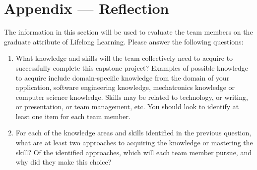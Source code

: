 \documentclass[12pt]{article}
\begin{document}
\newpage{}
\section*{Appendix --- Reflection}

The information in this section will be used to evaluate the team members on the
graduate attribute of Lifelong Learning.  Please answer the following questions:

\begin{enumerate}
  \item What knowledge and skills will the team collectively need to acquire to
  successfully complete this capstone project?  Examples of possible knowledge
  to acquire include domain-specific knowledge from the domain of your
  application, software engineering knowledge, mechatronics knowledge or
  computer science knowledge.  Skills may be related to technology, or writing,
  or presentation, or team management, etc.  You should look to identify at
  least one item for each team member.
  \item For each of the knowledge areas and skills identified in the previous
  question, what are at least two approaches to acquiring the knowledge or
  mastering the skill?  Of the identified approaches, which will each team
  member pursue, and why did they make this choice?
\end{enumerate}
\end{document}
